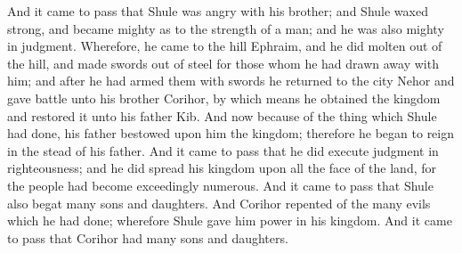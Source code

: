 And it came to pass that Shule was angry with his brother; and Shule waxed strong, and became mighty as to the strength of a man; and he was also mighty in judgment.
\bverse \iffalse Wherefore, he came to the hill Ephraim, and he did molten out of the hill, and made swords out of steel for those whom he had drawn away with him; and after he had armed them with swords he returned to the city Nehor and gave battle unto his brother Corihor, by which means he obtained the kingdom and restored it unto his father Kib. \fi
Wherefore, he came to the hill Ephraim, and he did molten out of the hill, and made swords out of steel for those whom he had drawn away with him; and after he had armed them with swords he returned to the city Nehor and gave battle unto his brother Corihor, by which means he obtained the kingdom and restored it unto his father Kib.
\bverse \iffalse And now because of the thing which Shule had done, his father bestowed upon him the kingdom; therefore he began to reign in the stead of his father. \fi
And now because of the thing which Shule had done, his father bestowed upon him the kingdom; therefore he began to reign in the stead of his father.
\bverse \iffalse And it came to pass that he did execute judgment in righteousness; and he did spread his kingdom upon all the face of the land, for the people had become exceedingly numerous. \fi
And it came to pass that he did execute judgment in righteousness; and he did spread his kingdom upon all the face of the land, for the people had become exceedingly numerous.
\bverse \iffalse And it came to pass that Shule also begat many sons and daughters. \fi
And it came to pass that Shule also begat many sons and daughters.
\bverse \iffalse And Corihor repented of the many evils which he had done; wherefore Shule gave him power in his kingdom. \fi
And Corihor repented of the many evils which he had done; wherefore Shule gave him power in his kingdom.
\bverse \iffalse And it came to pass that Corihor had many sons and daughters. \fi
And it came to pass that Corihor had many sons and daughters.

